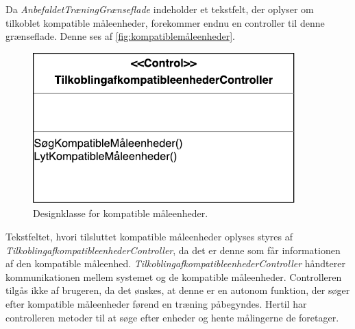 Da \textit{AnbefaldetTræningGrænseflade} indeholder et tekstfelt, der oplyser om tilkoblet kompatible måleenheder, forekommer endnu en controller til denne grænseflade. Denne ses af \autoref{fig:kompatiblemåleenheder}.

\begin{figure} [H]
\centering
\includegraphics[width=0.9\textwidth]{figures/MVC/MVCKompMaale}
\caption{Designklasse for kompatible måleenheder.}
\label{fig:kompatiblemåleenheder}
\end{figure}

\noindent
Tekstfeltet, hvori tilsluttet kompatible måleenheder oplyses styres af \textit{TilkoblingafkompatibleenhederController}, da det er denne som får informationen af den kompatible måleenhed.
\textit{TilkoblingafkompatibleenhederController} håndterer kommunikationen mellem systemet og de kompatible måleenheder. Controlleren tilgås ikke af brugeren, da det ønskes, at denne er en autonom funktion, der søger efter kompatible måleenheder førend en træning påbegyndes. Hertil har controlleren metoder til at søge efter enheder og hente målingerne de foretager.

